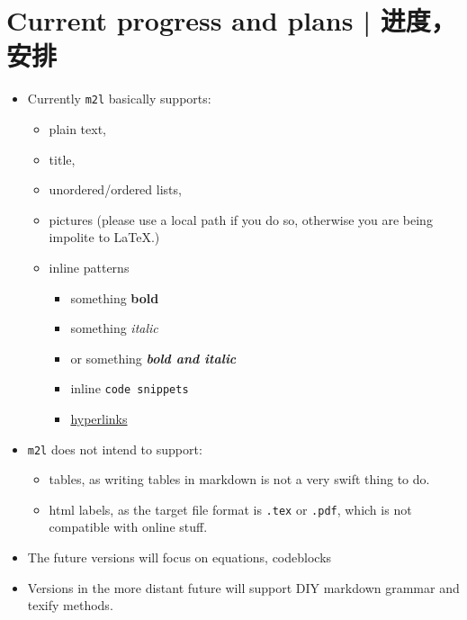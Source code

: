 \documentclass{ctexart}
\begin{document}
	\section{Current progress and plans | 进度，安排}

	\begin{itemize}
		\item Currently \texttt{m2l} basically supports:
		\begin{itemize}
			\item plain text,
			\item title,
			\item unordered/ordered lists,
			\item pictures (please use a local path if you do so, otherwise you are being impolite to LaTeX.)
			\item inline patterns
			\begin{itemize}
				\item something \textbf{bold}
				\item something \textit{italic}
				\item or something \textbf{\textit{bold and italic}}
				\item inline \texttt{code snippets}
				\item \href{https://http.cat/404}{hyperlinks}
			\end{itemize}
		\end{itemize}
		\item \texttt{m2l} does not intend to support:
		\begin{itemize}
			\item tables, as writing tables in markdown is not a very swift thing to do.
			\item html labels, as the target file format is \texttt{.tex} or \texttt{.pdf}, which is not compatible with online stuff.
		\end{itemize}
		\item The future versions will focus on equations, codeblocks
		\item Versions in the more distant future will support DIY markdown grammar and texify methods.
	\end{itemize}
\end{document}
